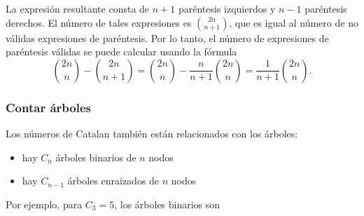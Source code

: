 La expresión resultante consta de $n+1$
paréntesis izquierdos y $n-1$ paréntesis derechos.
El número de tales expresiones es ${2n \choose n+1}$,
que es igual al número de no válidas
expresiones de paréntesis.
Por lo tanto, el número de expresiones de paréntesis válidas
se puede calcular usando la fórmula
\[{2n \choose n}-{2n \choose n+1} = {2n \choose n} - \frac{n}{n+1} {2n \choose n} = \frac{1}{n+1} {2n \choose n}.\]

\subsubsection{Contar árboles}

Los números de Catalan también están relacionados con los árboles:

\begin{itemize}
\item hay $C_n$ árboles binarios de $n$ nodos
\item hay $C_{n-1}$ árboles enraizados de $n$ nodos
\end{itemize}
\noindent
Por ejemplo, para $C_3=5$, los árboles binarios son

